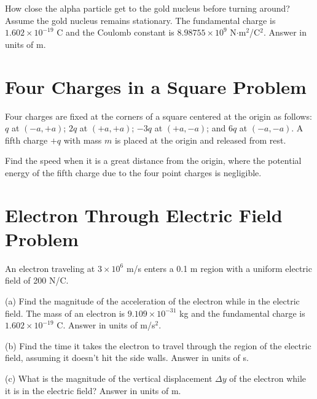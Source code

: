 \documentclass[../physics12.tex]{subfiles}
\begin{document}
How close the alpha particle get to the gold nucleus before turning around? Assume the gold nucleus remains stationary. The fundamental charge is $1.602\times 10^{-19}$ C and 
the Coulomb constant is $8.98755\times 10^9$ N$\cdot$m$^2$/C$^2$. Answer in units of m.

\section{Four Charges in a Square Problem}
Four charges are fixed at the corners of a square centered at the origin as follows: $q$ at $(-a, +a)$; $2q$ at $(+a, +a)$; $-3q$ at $(+a,-a)$; 
and $6q$ at $(-a,-a)$. A fifth charge $+q$ with mass $m$ is placed at the origin and released from rest.

Find the speed when it is a great distance from the origin, where the potential energy of the fifth charge due to the four point charges is negligible.

\section{Electron Through Electric Field Problem}
An electron traveling at $3\times 10^6$ m/s enters a 0.1 m region with a uniform electric field of 200 N/C. 

(a) Find the magnitude of the acceleration of the electron while in the electric field. The mass of an electron is $9.109\times 10^{-31}$ kg and the 
fundamental charge is $1.602\times 10^{-19}$ C. Answer in units of m/s$^2$.

(b) Find the time it takes the electron to travel through the region of the electric field, assuming it doesn't hit the side walls. Answer in units of s.

(c) What is the magnitude of the vertical displacement $\Delta y$ of the electron while it is in the electric field? Answer in units of m.
\end{document}
